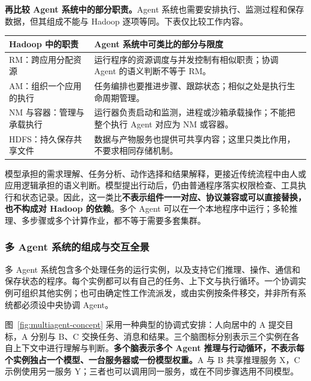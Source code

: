 \documentclass[11pt,a4paper]{article}
\begin{document}
\textbf{再比较 Agent 系统中的部分职责。}Agent 系统也需要安排执行、监测过程和保存数据，但其组成不能与 Hadoop 逐项等同。下表仅比较工作内容。

\begin{center}
\small\renewcommand{\arraystretch}{1.16}
\begin{tabularx}{\textwidth}{P{4.4cm}L}
\toprule
\textbf{Hadoop 中的职责} & \textbf{Agent 系统中可类比的部分与限度}\\
\midrule
RM：跨应用分配资源 & 运行程序的资源调度与并发控制有相似职责；协调 Agent 的语义判断不等于 RM。\\
\addlinespace[3pt]
AM：组织一个应用的执行 & 任务编排也要推进步骤、跟踪状态；相似之处是执行生命周期管理。\\
\addlinespace[3pt]
NM 与容器：管理与承载执行 & 运行器负责启动和监测，进程或沙箱承载操作；不能把整个执行 Agent 对应为 NM 或容器。\\
\addlinespace[3pt]
HDFS：持久保存共享文件 & 数据与产物服务也提供可共享内容；这里只类比作用，不要求相同存储机制。\\
\bottomrule
\end{tabularx}
\end{center}

模型承担的需求理解、任务分析、动作选择和结果解释，更接近传统流程中由人或应用逻辑承担的语义判断。模型提出行动后，仍由普通程序落实权限检查、工具执行和状态记录。因此，这一类比\textbf{不表示组件一一对应、协议兼容或可以直接替换，也不构成对 Hadoop 的依赖}。多个 Agent 可以在一个本地程序中运行；多轮推理、多步骤或多个计算作业，都不等于需要多套集群。

\subsubsection{多 Agent 系统的组成与交互全景}

多 Agent 系统包含多个处理任务的运行实例，以及支持它们推理、操作、通信和保存状态的程序。每个实例都可以有自己的任务、上下文与执行循环。一个协调实例可组织其他实例；也可由确定性工作流派发，或由实例按条件移交，并非所有系统都必须设中央协调 Agent。

图~\ref{fig:multiagent-concept} 采用一种典型的协调式安排：人向居中的 A 提交目标，A 分别与 B、C 交换任务、消息和结果。三个脑图标分别表示三个实例在各自上下文中进行理解与判断。\textbf{多个脑表示多个 Agent 推理与行动循环，不表示每个实例独占一个模型、一台服务器或一份模型权重。}A 与 B 共享推理服务 X，C 示例使用另一服务 Y；三者也可以调用同一服务，或在不同步骤选用不同模型。
\end{document}
